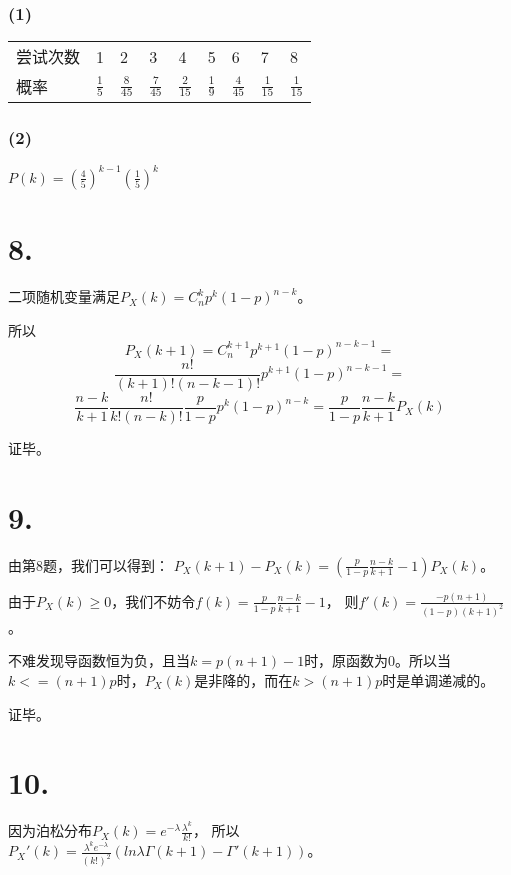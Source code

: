 \documentclass[UTF8]{report}
\begin{document}
            \subsubsection*{(1)}
                \begin{table}[!htbp]
                    \begin{tabular}{lllllllll}
                        尝试次数 & 1 & 2 & 3 & 4 & 5 & 6 & 7 & 8\\
                        概率 & $\frac{1}{5}$ & $\frac{8}{45}$ & $\frac{7}{45}$ & $\frac{2}{15}$ & $\frac{1}{9}$ & $\frac{4}{45}$ & $\frac{1}{15}$ & $\frac{1}{15}$
                    \end{tabular}
                \end{table}
            \subsubsection*{(2)}
                $P(k) = (\frac{4}{5})^{k - 1}(\frac{1}{5})^k$
    \section*{8.}
        二项随机变量满足$P_X(k) = C_n^kp^k(1 - p)^{n - k}$。
        
        所以
        $$P_X(k + 1) = C_n^{k + 1}p^{k + 1}(1 - p)^{n - k - 1} = $$
        $$\frac{n!}{(k + 1)!(n - k -1)!}p^{k + 1}(1 - p)^{n - k - 1} = $$
        $$\frac{n - k}{k + 1}\frac{n!}{k!(n - k)!}\frac{p}{1 - p}p^k(1 - p)^{n - k} = \frac{p}{1 - p}\frac{n - k}{k + 1}P_X(k)$$

        证毕。
    \section*{9.}
        由第8题，我们可以得到：
        $P_X(k + 1) - P_X(k) = (\frac{p}{1 - p}\frac{n - k}{k + 1} - 1)P_X(k)$。

        由于$P_X(k) \geq 0$，我们不妨令$f(k) = \frac{p}{1 - p}\frac{n - k}{k + 1} - 1$，
        则$f'(k) = \frac{-p(n + 1)}{(1 - p)(k + 1)^2}$。

        不难发现导函数恒为负，且当$k = p(n + 1) - 1$时，原函数为0。所以当$k <= (n + 1)p$时，$P_X(k)$是非降的，而在$k > (n + 1)p$时是单调递减的。

        证毕。
    \section*{10.}
        因为泊松分布$P_X(k) = e^{-\lambda}\frac{\lambda^k}{k!}$，
        所以$P_X'(k) = \frac{\lambda^ke^{-\lambda}}{(k!)^2}(ln\lambda\Gamma(k + 1) - \Gamma'(k + 1))$。
\end{document}
